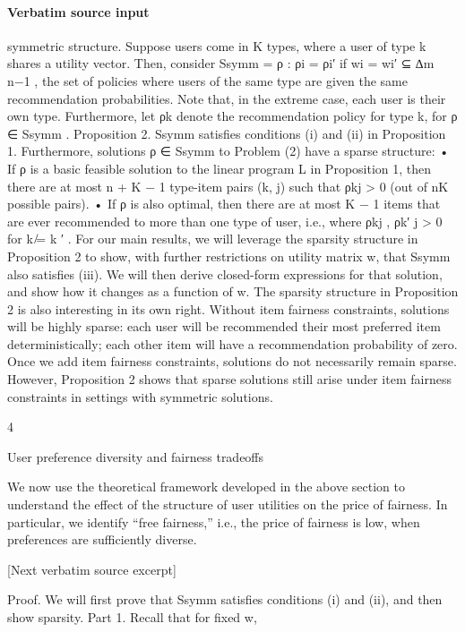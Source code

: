 \documentclass[10pt]{article}
\begin{document}
\paragraph{Verbatim source input}
\begin{ReviewVerbatim}
symmetric structure. Suppose users come in K types, where a user of type k shares a utility vector.
Then, consider Ssymm = {ρ : ρi = ρi′ if wi = wi′ } ⊆ ∆m
n−1 , the set of policies where users of the
same type are given the same recommendation probabilities. Note that, in the extreme case, each user
is their own type. Furthermore, let ρk denote the recommendation policy for type k, for ρ ∈ Ssymm .
Proposition 2. Ssymm satisfies conditions (i) and (ii) in Proposition 1. Furthermore, solutions
ρ ∈ Ssymm to Problem (2) have a sparse structure:
• If ρ is a basic feasible solution to the linear program L in Proposition 1, then there are at
most n + K − 1 type-item pairs (k, j) such that ρkj > 0 (out of nK possible pairs).
• If ρ is also optimal, then there are at most K − 1 items that are ever recommended to more
than one type of user, i.e., where ρkj , ρk′ j > 0 for k ̸= k ′ .
For our main results, we will leverage the sparsity structure in Proposition 2 to show, with further
restrictions on utility matrix w, that Ssymm also satisfies (iii). We will then derive closed-form
expressions for that solution, and show how it changes as a function of w.
The sparsity structure in Proposition 2 is also interesting in its own right. Without item fairness
constraints, solutions will be highly sparse: each user will be recommended their most preferred item
deterministically; each other item will have a recommendation probability of zero. Once we add item
fairness constraints, solutions do not necessarily remain sparse. However, Proposition 2 shows that
sparse solutions still arise under item fairness constraints in settings with symmetric solutions.

4

User preference diversity and fairness tradeoffs

We now use the theoretical framework developed in the above section to understand the effect of the
structure of user utilities on the price of fairness. In particular, we identify “free fairness,” i.e., the
price of fairness is low, when preferences are sufficiently diverse.

[Next verbatim source excerpt]

Proof. We will first prove that Ssymm satisfies conditions (i) and (ii), and then show sparsity.
Part 1. Recall that for fixed w,
\


\end{ReviewVerbatim}
\end{document}
